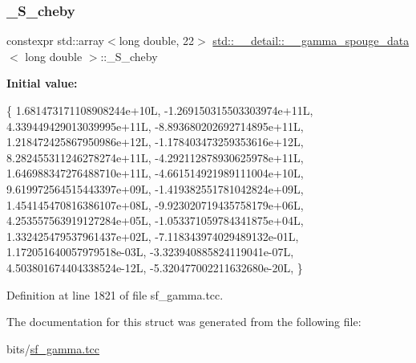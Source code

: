 \subsubsection{\texorpdfstring{\+\_\+\+S\+\_\+cheby}{\_S\_cheby}}
{\footnotesize\ttfamily constexpr std\+::array$<$long double, 22$>$ \hyperlink{structstd_1_1____detail_1_1____gamma__spouge__data}{std\+::\+\_\+\+\_\+detail\+::\+\_\+\+\_\+gamma\+\_\+spouge\+\_\+data}$<$ long double $>$\+::\+\_\+\+S\+\_\+cheby\hspace{0.3cm}{\ttfamily [static]}}

{\bfseries Initial value\+:}
\begin{DoxyCode}
\{
     1.681473171108908244e+10L,
    -1.269150315503303974e+11L,
     4.339449429013039995e+11L,
    -8.893680202692714895e+11L,
     1.218472425867950986e+12L,
    -1.178403473259353616e+12L,
     8.282455311246278274e+11L,
    -4.292112878930625978e+11L,
     1.646988347276488710e+11L,
    -4.661514921989111004e+10L,
     9.619972564515443397e+09L,
    -1.419382551781042824e+09L,
     1.454145470816386107e+08L,
    -9.923020719435758179e+06L,
     4.253557563919127284e+05L,
    -1.053371059784341875e+04L,
     1.332425479537961437e+02L,
    -7.118343974029489132e-01L,
     1.172051640057979518e-03L,
    -3.323940885824119041e-07L,
     4.503801674404338524e-12L,
    -5.320477002211632680e-20L,
      \}
\end{DoxyCode}


Definition at line 1821 of file sf\+\_\+gamma.\+tcc.



The documentation for this struct was generated from the following file\+:\begin{DoxyCompactItemize}
\item 
bits/\hyperlink{sf__gamma_8tcc}{sf\+\_\+gamma.\+tcc}\end{DoxyCompactItemize}
